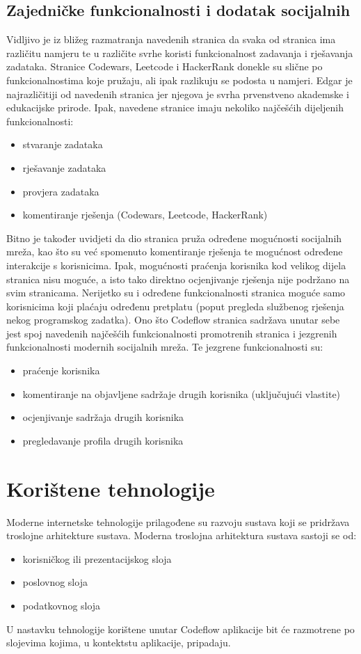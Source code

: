 \documentclass[times, utf8, zavrsni]{fer}
\begin{document}
		\section{Zajedničke funkcionalnosti i dodatak socijalnih}
		Vidljivo je iz bližeg razmatranja navedenih stranica da svaka od stranica ima različitu namjeru te u različite svrhe koristi funkcionalnost zadavanja i rješavanja zadataka. Stranice Codewars, Leetcode i HackerRank donekle su slične po funkcionalnostima koje pružaju, ali ipak razlikuju se podosta u namjeri. Edgar je najrazličitiji od navedenih stranica jer njegova je svrha prvenstveno akademske i edukacijske prirode. Ipak, navedene stranice imaju nekoliko najčešćih dijeljenih funkcionalnosti:
		\begin{itemize}
			\item stvaranje zadataka
			\item rješavanje zadataka
			\item provjera zadataka
			\item komentiranje rješenja (Codewars, Leetcode, HackerRank)
		\end{itemize}
		Bitno je također uvidjeti da dio stranica pruža određene mogućnosti socijalnih mreža, kao što su već spomenuto komentiranje rješenja te mogućnost određene interakcije s korisnicima. Ipak, mogućnosti praćenja korisnika kod velikog dijela stranica nisu moguće, a isto tako direktno ocjenjivanje rješenja nije podržano na svim stranicama. Nerijetko su i određene funkcionalnosti stranica moguće samo korisnicima koji plaćaju određenu pretplatu (poput pregleda službenog rješenja nekog programskog zadatka).
		Ono što Codeflow stranica sadržava unutar sebe jest spoj navedenih najčešćih funkcionalnosti promotrenih stranica i jezgrenih funkcionalnosti modernih socijalnih mreža. Te jezgrene funkcionalnosti su:
		\begin{itemize}
			\item praćenje korisnika
			\item komentiranje na objavljene sadržaje drugih korisnika (uključujući vlastite)
			\item ocjenjivanje sadržaja drugih korisnika
			\item pregledavanje profila drugih korisnika
		\end{itemize}
	
	
	\chapter{Korištene tehnologije}
	\label{cha:tehnologije}
	Moderne internetske tehnologije prilagođene su razvoju sustava koji se pridržava troslojne arhitekture sustava. Moderna troslojna arhitektura sustava sastoji se od:
	\begin{itemize}
		\item korisničkog ili prezentacijskog sloja
		\item poslovnog sloja
		\item podatkovnog sloja
	\end{itemize}
	U nastavku tehnologije korištene unutar Codeflow aplikacije bit će razmotrene po slojevima kojima, u kontektstu aplikacije, pripadaju.
	
\end{document}
